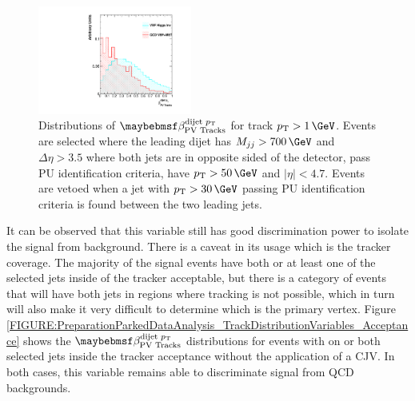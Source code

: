 \begin{figure}[!htb]
\centering
\includegraphics[width=0.45\textwidth]{Chapter06/TrackVariables/Images/Tracks1_CJVPass_TracksERation.pdf}
\caption[Distributions of $\beta_{\text{PV Tracks}}^{\text{dijet }\pt}$ for track $\pt>1\,\GeV$ for events passing a central jet veto.]
{Distributions of $\beta_{\text{PV Tracks}}^{\text{dijet }\pt}$ for track $\pt>1\,\GeV$. Events are selected where the leading dijet has $M_{jj}>700\,\GeV$ and $\Delta\eta>3.5$ where both jets are in opposite sided of the detector, pass \gls{PU} identification criteria, have $\pt>50\,\GeV$ and $|\eta|<4.7$. Events are vetoed when a jet with  $\pt>30\,\GeV$ passing \gls{PU} identification criteria is found between the two leading jets.}
\label{FIGURE:PreparationParkedDataAnalysis_TrackDistributionVariables_SelectionCJV}
\end{figure}

It can be observed that this variable still has good discrimination power to isolate the signal from background. There is a caveat in its usage which is the tracker coverage. The majority of the signal events have both or at least one of the selected jets inside of the tracker acceptable, but there is a category of events that will have both jets in regions where tracking is not possible, which in turn will also make it very difficult to determine which is the primary vertex. Figure \ref{FIGURE:PreparationParkedDataAnalysis_TrackDistributionVariables_Acceptance} shows the $\beta_{\text{PV Tracks}}^{\text{dijet }\pt}$ distributions for events with on or both selected jets inside the tracker acceptance without the application of a \gls{CJV}. In both cases, this variable remains able to discriminate signal from \gls{QCD} backgrounds. 

